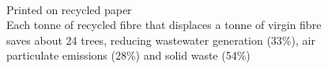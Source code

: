 \newpage
\thispagestyle{empty}

\vspace*{\fill}
    \begin{center}
      {\fontsize{50}{60} \faRecycle}\\[0.5cm]
      {\Large Printed on recycled paper}\\[0.4cm]
      {\color{gray75} Each tonne of recycled fibre that displaces a tonne of virgin fibre \\ saves about 24 trees, reducing wastewater generation (33\%), air \\ particulate emissions (28\%) and solid waste (54\%)}\\[0.4cm]
    \end{center}
    \vspace*{\fill}